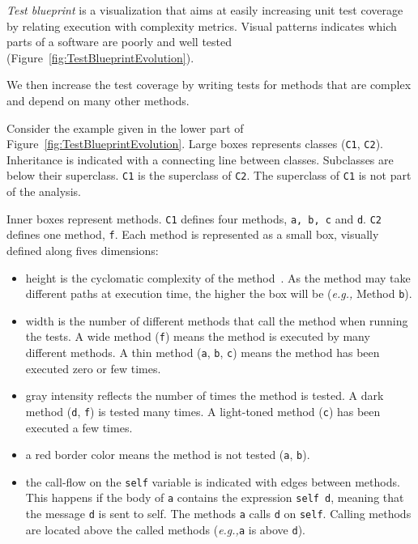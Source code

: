 \documentclass[runningheads]{llncs}
\newcommand{\ct}{\lstinline[backgroundcolor=\color{white},basicstyle=\footnotesize\ttfamily]}
\newcommand{\eg}{\emph{e.g.,}\xspace}
\newcommand{\figref}[1]{Figure~\ref{fig:#1}}
\begin{document}
\emph{Test blueprint} is a visualization that aims at easily increasing unit test coverage by relating execution with complexity metrics. Visual patterns indicates which parts of a software are poorly and well tested (\figref{TestBlueprintEvolution}).

We then increase the test coverage by writing tests for methods that are complex and depend on many other methods.

Consider the example given in the lower part of \figref{TestBlueprintEvolution}. Large boxes represents classes (\ct{C1}, \ct{C2}). Inheritance is indicated with a connecting line between classes. Subclasses are below their superclass. \ct{C1} is the superclass of \ct{C2}. The superclass of \ct{C1} is not part of the analysis.

Inner boxes represent methods. \ct{C1} defines four methods, \ct{a, b, c} and \ct {d}. \ct{C2} defines one method, \ct{f}. Each method is represented as a small box, visually defined along fives dimensions:

\begin{itemize}
\item height is the cyclomatic complexity of the method~\cite{McCa76a}. As the method may take different paths at execution time, the higher the box will be (\eg Method \ct{b}).
\item width is the number of different methods that call the method when running the tests. A wide method (\ct{f}) means the method is executed by many different methods. A thin method (\ct{a}, \ct{b}, \ct{c}) means the method has been executed zero or few times.
\item gray intensity reflects the number of times the method is tested. A dark method (\ct{d}, \ct{f}) is tested many times. A light-toned method (\ct{c}) has been executed a few times.
\item a red border color means the method is not tested (\ct{a}, \ct{b}). 
\item the call-flow on the \ct{self} variable is indicated with edges between methods. This happens if the body of \ct{a} contains the expression \ct{self d}, meaning that the message \ct{d} is sent to self. The methods \ct{a} calls \ct{d} on \ct{self}. %
Calling methods are located above the called methods (\eg \ct{a} is above \ct{d}).
\end{itemize}
\end{document}
